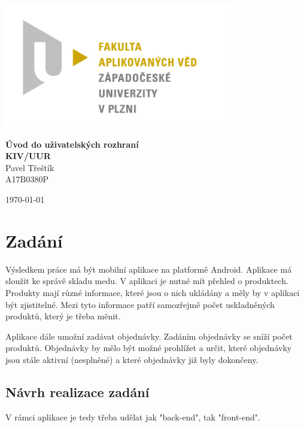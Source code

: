 \documentclass[12pt]{report}
\begin{document}
%

\begin{titlepage}
\centerline{\includegraphics[width=10cm]{img/logo.jpg}}
\begin{center}
\vspace{30px}
{\huge
\textbf{Úvod do uživatelských rozhraní}\\
\textbf{KIV/UUR}\\
\vspace{1cm}
}
{
\vspace{1cm}
}
\vspace{1cm}
{\large
Pavel Třeštík\\
}
{\normalsize
A17B0380P
}
\end{center}
\vspace{\fill}
\hfill
\begin{minipage}[t]{7cm}
\flushright
\today
\end{minipage}
\end{titlepage}
%
%
%
\tableofcontents
%
%
%
\chapter{Zadání}
Výsledkem práce má být mobilní aplikace na platformě Android. Aplikace má sloužit
ke správě skladu medu. V aplikaci je nutné mít přehled o produktech. Produkty mají
různé informace, které jsou o nich ukládány a měly by v aplikaci být zjistitelné.
Mezi tyto informace patří samozřejmě počet uskladněných produktů, který je třeba měnit.

Aplikace dále umožní zadávat objednávky. Zadáním objednávky se sníží počet produktů.
Objednávky by mělo být možné prohlížet a určit, které objednávky jsou stále aktivní (nesplněné)
a které objednávky již byly dokončeny.
%
\section{Návrh realizace zadání}
V rámci aplikace je tedy třeba udělat jak "back-end", tak "front-end". 
\end{document}
